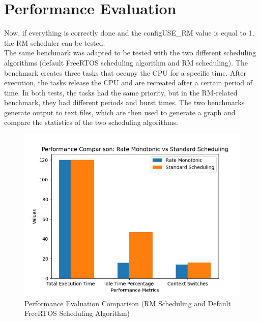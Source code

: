 \section{Performance Evaluation}
Now, if everything is correctly done and the configUSE\_RM value is equal to 1, the RM scheduler can be tested.\\
The same benchmark was adapted to be tested with the two different scheduling algorithms (default FreeRTOS scheduling algorithm and RM scheduling). The benchmark creates three tasks that occupy the CPU for a specific time. After execution, the tasks release the CPU and are recreated after a certain period of time. In both tests, the tasks had the same priority, but in the RM-related benchmark, they had different periods and burst times. The two benchmarks generate output to text files, which are then used to generate a graph and compare the statistics of the two scheduling algorithms.

\begin{figure}[H]
    \centering
    \includegraphics[width=1\linewidth]{img/performance.jpg}
    \caption{Performance Evaluation Comparison (RM Scheduling and Default FreeRTOS Scheduling Algorithm)}
    \label{fig:performance}
\end{figure}

